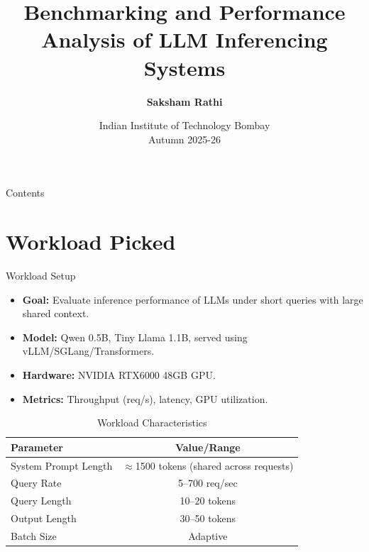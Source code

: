 \documentclass[Serif, 10pt, brown]{beamer}
\title[{Systems for LLMs}]{\sc Benchmarking and Performance Analysis of LLM Inferencing Systems}
\author[\ul{Authors}]{{\textbf{Saksham Rathi}}}
\institute[UTD]{\sc\small Systems for LLMs\\ Under Prof. Mythili Vutukuru}
\date[UCI]{Indian Institute of Technology Bombay \\ Autumn 2025-26}
\theoremstyle{example}
\theoremstyle{plain}
\begin{document}
\frame{\titlepage}

\begin{frame}{Contents}
	\tableofcontents
\end{frame}

\section{Workload Picked}

\begin{frame}{Workload Setup}
\begin{itemize}
    \item \textbf{Goal:} Evaluate inference performance of LLMs under short queries with large shared context.
    \item \textbf{Model:} Qwen 0.5B, Tiny Llama 1.1B, served using vLLM/SGLang/Transformers.
    \item \textbf{Hardware:} NVIDIA RTX6000 48GB GPU.
    \item \textbf{Metrics:} Throughput (req/s), latency, GPU utilization.
\end{itemize}

\begin{table}[h!]
\centering
\scriptsize
\begin{tabular}{|l|c|}
\hline
\textbf{Parameter} & \textbf{Value/Range} \\
\hline
System Prompt Length & $\approx$1500 tokens (shared across requests) \\
Query Rate & 5–700 req/sec \\
Query Length & 10–20 tokens \\
Output Length & 30–50 tokens \\
Batch Size & Adaptive \\
\hline
\end{tabular}
\caption{Workload Characteristics}
\end{table}
\end{frame}
\end{document}
